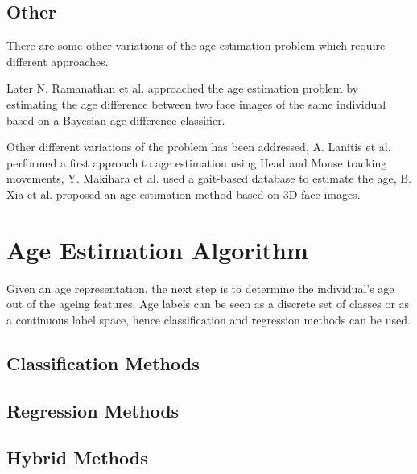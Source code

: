 \subsection{Other}

There are some other variations of the age estimation problem which require different approaches. 

Later N. Ramanathan et al. \cite{1709980} approached the age estimation problem by estimating the age difference between two face images of the same individual based on a Bayesian age-difference classifier.

Other different variations of the problem has been addressed, A. Lanitis et al. \cite{5463396} performed a first approach to age estimation using Head and Mouse tracking movements, Y. Makihara et al. \cite{6117531} used a gait-based database to estimate the age, B. Xia et al. \cite{xia:hal-00904007} proposed an age estimation method based on 3D face images.


\section{Age Estimation Algorithm}
Given an age representation, the next step is to determine the individual's age out of the ageing features. Age labels can be seen as a discrete set of classes or as a continuous label space, hence classification and regression methods can be used.

\subsection{Classification Methods}
\subsection{Regression Methods}
\subsection{Hybrid Methods}

